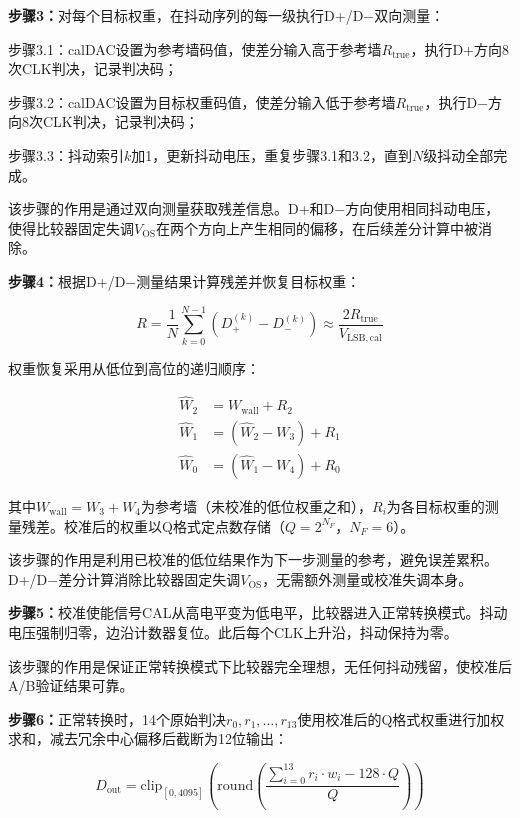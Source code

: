 \documentclass[UTF8,a4paper,11pt]{ctexart}
\begin{document}
\textbf{步骤3：}对每个目标权重，在抖动序列的每一级执行D+/D$-$双向测量：

步骤3.1：calDAC设置为参考墙码值，使差分输入高于参考墙$R_{\mathrm{true}}$，执行D+方向8次CLK判决，记录判决码；

步骤3.2：calDAC设置为目标权重码值，使差分输入低于参考墙$R_{\mathrm{true}}$，执行D$-$方向8次CLK判决，记录判决码；

步骤3.3：抖动索引$k$加1，更新抖动电压，重复步骤3.1和3.2，直到$N$级抖动全部完成。

该步骤的作用是通过双向测量获取残差信息。D+和D$-$方向使用相同抖动电压，使得比较器固定失调$V_{\mathrm{OS}}$在两个方向上产生相同的偏移，在后续差分计算中被消除。

\textbf{步骤4：}根据D+/D$-$测量结果计算残差并恢复目标权重：

\begin{equation}
R = \frac{1}{N}\sum_{k=0}^{N-1}\left(D_+^{(k)} - D_-^{(k)}\right) \approx \frac{2 R_{\mathrm{true}}}{V_{\mathrm{LSB,cal}}}
\end{equation}

权重恢复采用从低位到高位的递归顺序：

\begin{align}
\widehat{W}_2 &= W_{\mathrm{wall}} + R_2 \\
\widehat{W}_1 &= (\widehat{W}_2 - W_3) + R_1 \\
\widehat{W}_0 &= (\widehat{W}_1 - W_4) + R_0
\end{align}

其中$W_{\mathrm{wall}} = W_3 + W_4$为参考墙（未校准的低位权重之和），$R_i$为各目标权重的测量残差。校准后的权重以Q格式定点数存储（$Q = 2^{N_F}$，$N_F=6$）。

该步骤的作用是利用已校准的低位结果作为下一步测量的参考，避免误差累积。D+/D$-$差分计算消除比较器固定失调$V_{\mathrm{OS}}$，无需额外测量或校准失调本身。

\textbf{步骤5：}校准使能信号CAL从高电平变为低电平，比较器进入正常转换模式。抖动电压强制归零，边沿计数器复位。此后每个CLK上升沿，抖动保持为零。

该步骤的作用是保证正常转换模式下比较器完全理想，无任何抖动残留，使校准后A/B验证结果可靠。

\textbf{步骤6：}正常转换时，14个原始判决$r_0, r_1, \ldots, r_{13}$使用校准后的Q格式权重进行加权求和，减去冗余中心偏移后截断为12位输出：

\begin{equation}
D_{\mathrm{out}} = \mathrm{clip}_{[0, 4095]}\left(\mathrm{round}\left(\frac{\sum_{i=0}^{13} r_i \cdot w_i - 128 \cdot Q}{Q}\right)\right)
\end{equation}
\end{document}

